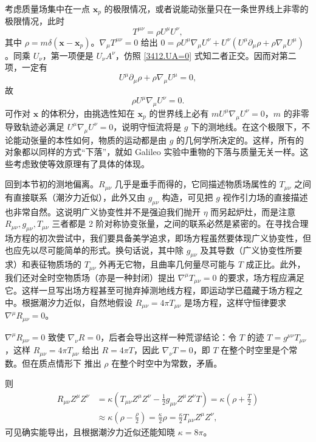 考虑质量场集中在一点 $\bm x_p$ 的极限情况，或者说能动张量只在一条世界线上非零的极限情况，此时
\[
T^{\mu\nu}=\rho U^\mu U^\nu,
\]
其中 $\rho=m\delta(\bm x-\bm x_p)$。$\nabla_\mu T^{\mu\nu}=0$ 给出 $0=\rho U^\mu \nabla_\mu U^\nu+ U^\nu (U^\mu\partial_\mu\rho+\rho\nabla_\mu U^\mu)$。同乘 $U_\nu$，第一项便是 $U_\nu A^\nu$，仿照 \eqref{3412.UA=0} 式知二者正交。因而对第二项，一定有
\[
U^\mu\partial_\mu\rho+\rho\nabla_\mu U^\mu=0,
\]
故
\[
\rho U^\mu \nabla_\mu U^\nu=0.
\]
可作对 $\bm x$ 的体积分，由挑选性知在 $\bm x_p$ 的世界线上必有 $m U^\mu \nabla_\mu U^\nu=0$，$m$ 的非零导致轨迹必满足 $U^\mu \nabla_\mu U^\nu=0$，说明守恒流将是 $g$ 下的测地线。在这个极限下，不论能动张量的本性如何，物质的运动都是由 $g$ 的几何学所决定的。这样，所有的对象都以同样的方式“下落”，就如 Galileo 实验中重物的下落与质量无关一样。这些考虑致使等效原理有了具体的体现。

回到本节初的测地偏离。$R_{\mu\nu}$ 几乎是垂手而得的，它同描述物质场属性的 $T_{\mu\nu}$ 之间有直接联系（潮汐力近似），此外又由 $g_{\mu\nu}$ 构造，可见把 $g$ 视作引力场的直接描述也非常自然。这说明广义协变性并不是强迫我们抛开 $\eta$ 而另起炉灶，而是注意 $R_{\mu\nu},g_{\mu\nu},T_{\mu\nu}$ 三者都是 2 阶对称协变张量，之间的联系必然是紧密的。在寻找合理场方程的初次尝试中，我们要具备美学追求，即场方程虽然要体现广义协变性，但也应先以尽可能简单的形式。换句话说，其中除 $g_{\mu\nu}$ 及其导数（广义协变性所要求）和表征物质场的 $T_{\mu\nu}$ 外再无它物，且曲率几何量尽可能与 $T$ 成正比。此外，我们还对全时空物质场（亦是一种封闭）提出 $\nabla^\mu T_{\mu\nu}=0$ 的要求，场方程应满足它。这样一旦写出场方程甚至可抛弃掉测地线方程，即运动学已蕴藏于场方程之中。根据潮汐力近似，自然地假设 $R_{\mu\nu}=4\pi  T_{\mu\nu}$ 是场方程，这样守恒律要求 $\nabla^\mu R_{\mu\nu}=0$。


$\nabla^\mu R_{\mu\nu}=0$ 致使 $\nabla_\nu R=0$，后者会导出这样一种荒谬结论：令 $T$ 的迹 $T=g^{\mu\nu}T_{\mu\nu}$，这样 $R_{\mu\nu}=4\pi  T_{\mu\nu}$ 给出 $R=4\pi  T$，因此 $\nabla_\nu T=0$，即 $T$ 在整个时空里是个常数。但在质点情形下
推出 $\rho$ 在整个时空中为常数，矛盾。

则
\begin{align*}
    R_{\mu\nu}Z^\mu Z^\nu&=\kappa\left(T_{\mu\nu}Z^\mu Z^\nu-\frac12 g_{\mu\nu}Z^\mu Z^\nu T\right)=\kappa\left(\rho+\frac T2\right)\\
    &\approx \kappa\left(\rho-\frac\rho 2\right)=\frac\kappa 2\rho=\frac\kappa 2 T_{\mu\nu}Z^\mu Z^\nu,
\end{align*}
可见确实能导出，且根据潮汐力近似还能知晓 $\kappa=8\pi$。


